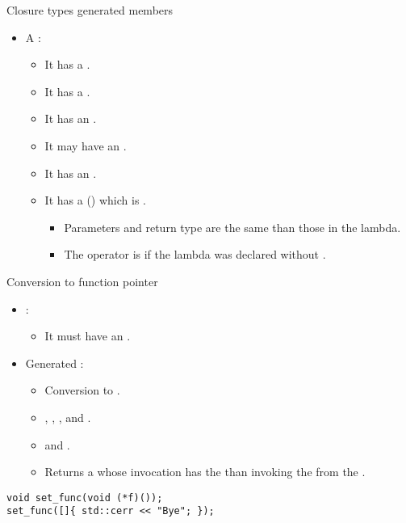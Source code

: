 \begin{frame}[t,fragile]{Closure types generated members}
\begin{itemize}
  \item A :
    \begin{itemize}
      \item It has a  . 
      \item It has a  .
      \item It has an  .
      \item It may have an  .
      \item It has an  .
      \item It has a  
            () which is .
        \begin{itemize}
          \item Parameters and return type are the same than those in the lambda.
          \item The operator is  if the lambda was declared without .
        \end{itemize}
    \end{itemize}
\end{itemize}
\end{frame}

\begin{frame}[t,fragile]{Conversion to function pointer}
  \begin{itemize}
    \item {}:
      \begin{itemize}
        \item It must have an .
      \end{itemize}
    \item Generated :
      \begin{itemize}
        \item Conversion to .
        \item {} , , 
              , and .
        \item {}  and .
        \item Returns a  whose invocation has the
               than invoking the
               from the .
      \end{itemize}
  \end{itemize}
\begin{lstlisting}
void set_func(void (*f)());
set_func([]{ std::cerr << "Bye"; });
\end{lstlisting}
\end{frame}

